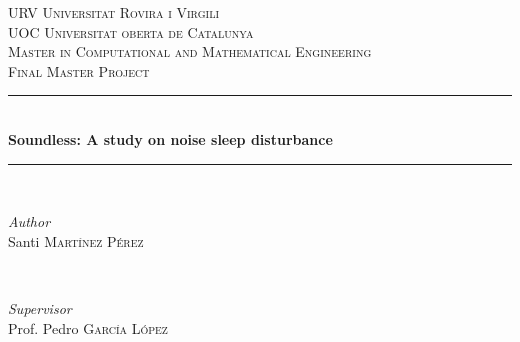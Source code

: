 \begin{titlepage} %
	\newcommand{\HRule}{\rule{\linewidth}{0.5mm}} %
	
	\center %
	
	
	\textsc{\LARGE URV Universitat Rovira i Virgili}\\[0.5cm] %
	\textsc{\LARGE UOC Universitat oberta de Catalunya}\\[1.5cm]
	
	\textsc{\Large Master in Computational and Mathematical Engineering}\\[0.5cm] %
	
	\textsc{\large Final Master Project}\\[0.5cm] %
	
	
	\HRule\\[0.4cm]
	
	{\huge\bfseries Soundless: A study on noise sleep disturbance}\\[0.4cm] %
	
	\HRule\\[1.5cm]
	
	
	\begin{minipage}{0.4\textwidth}
		\begin{flushleft}
			\large
			\textit{Author}\\
			Santi \textsc{Mart\'inez P\'erez} %
		\end{flushleft}
	\end{minipage}
	~
	\begin{minipage}{0.4\textwidth}
		\begin{flushright}
			\large
			\textit{Supervisor}\\
			Prof. Pedro \textsc{Garc\'ia L\'opez} %
		\end{flushright}
	\end{minipage}
	

\end{titlepage}
